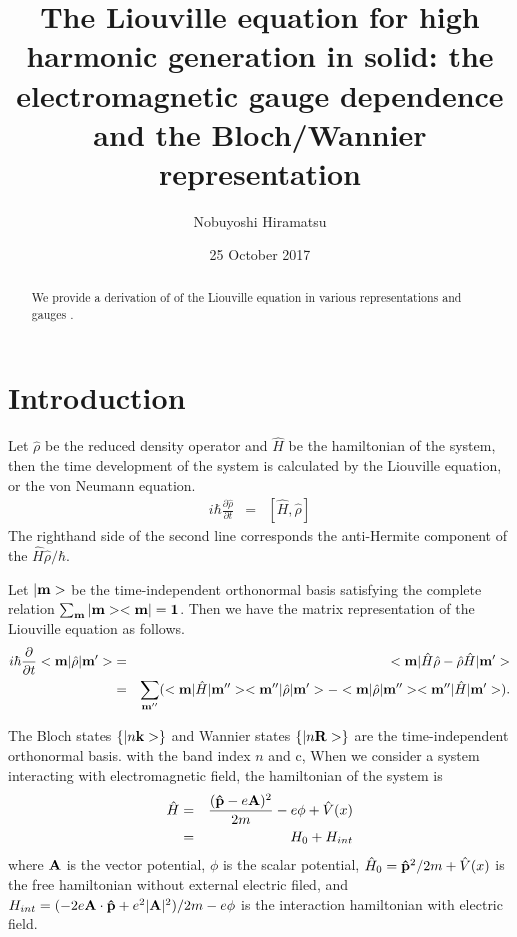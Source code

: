 \documentclass[aps,prb,preprint]{revtex4-1}
\begin{document}
\title{The Liouville equation for high harmonic generation in solid: the electromagnetic gauge dependence and the Bloch/Wannier representation}
\author{Nobuyoshi Hiramatsu}
\date{25 October 2017}
\begin{abstract}
We provide a derivation of of the Liouville equation in various representations and gauges .
\end{abstract}
\maketitle

\section{Introduction}
Let $\hat{\rho}$ be the reduced density operator and $\hat{H}$ be the hamiltonian of the system, then the time development of the system is calculated by the Liouville equation, or the von Neumann equation.
\begin{eqnarray}
i \hbar \frac{\partial \hat{\rho} }{\partial t } &=&  [\hat{H}, \hat{\rho}] %
\end{eqnarray}
The righthand side of the second line corresponds the anti-Hermite component of the $\hat{H}\hat{\rho}/ \hbar$.

Let $|{\bf m}>$ be the time-independent orthonormal basis satisfying the complete relation $\sum_{\bf m} |{\bf m}><{\bf m}| = {\bf 1}$. Then we have the matrix representation of the Liouville equation as follows.
\begin{eqnarray}
i \hbar \frac{ \partial }{\partial t } <{\bf m}| \hat{\rho} |{\bf m'}> &=&  <{\bf m}| \hat{H} \hat{\rho} - \hat{\rho} \hat{H} |{\bf m'}> \nonumber\\
&=&  \sum_{{\bf m''}} ( <{\bf m}| \hat{H} |{\bf m''}><{\bf m''}| \hat{\rho} |{\bf m'}> - <{\bf m}| \hat{\rho} |{\bf m''}><{\bf m''}| \hat{H} |{\bf m'}> ).\label{eq:LE2} \end{eqnarray} 

The Bloch states $\{ |n{\bf k}> \}$ and Wannier states $\{ |n{\bf R}> \}$ are the time-independent orthonormal basis.
with the band index $n$ and c,
When we consider a system interacting with electromagnetic field, the hamiltonian of the system is
 \begin{eqnarray}
 \hat{H} &=&\frac{ ({\bf \hat{p}} - e{\bf A})^2 }{2m} -e \phi + \hat{V}(x) \nonumber \\ 
 &=& H_0 + H_{int} 
 \end{eqnarray}
where ${\bf A}$ is the vector potential, $\phi$ is the scalar potential, $\hat{H}_0 = {\bf \hat{p}}^2/2m + \hat{V}(x)$ is the free hamiltonian without external electric filed, and $H_{int} =( - 2e{\bf A} \cdot {\bf \hat{p}} + e^2 |{\bf A}|^2)/2m -e \phi$ is the interaction hamiltonian with electric field.
\end{document}
